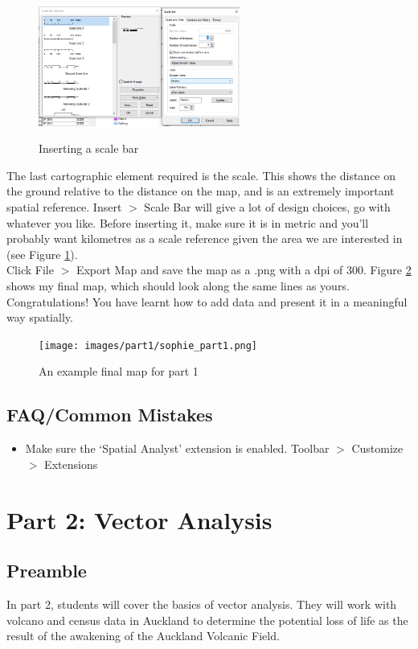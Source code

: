 \documentclass{article}
\begin{document}
\begin{figure}[h]
    \centering
    \caption{Inserting a scale bar}
    \includegraphics[width=250px]{images/part1/layout_scalebar.PNG}
    \label{layout_scalebar}
\end{figure}

The last cartographic element required is the scale. This shows the distance on the ground relative to the distance on the map, and is an extremely important spatial reference. Insert $>$ Scale Bar will give a lot of design choices, go with whatever you like. Before inserting it, make sure it is in metric and you'll probably want kilometres as a scale reference given the area we are interested in (see Figure \ref{layout_scalebar}).\\

Click File $>$ Export Map and save the map as a .png with a dpi of 300. Figure \ref{example_part1} shows my final map, which should look along the same lines as yours. Congratulations! You have learnt how to add data and present it in a meaningful way spatially.

\begin{figure}[h]
    \centering
    \caption{An example final map for part 1}
    \texttt{[image: images/part1/sophie\_part1.png]}
    \label{example_part1}
\end{figure}

\subsection{FAQ/Common Mistakes}
\begin{itemize}
    \item Make sure the `Spatial Analyst' extension is enabled. Toolbar $>$ Customize $>$ Extensions
\end{itemize}

\pagebreak

\section{Part 2: Vector Analysis}
\subsection{Preamble}
In part 2, students will cover the basics of vector analysis. They will work with volcano and census data in Auckland to determine the potential loss of life as the result of the awakening of the Auckland Volcanic Field. \\
\end{document}
